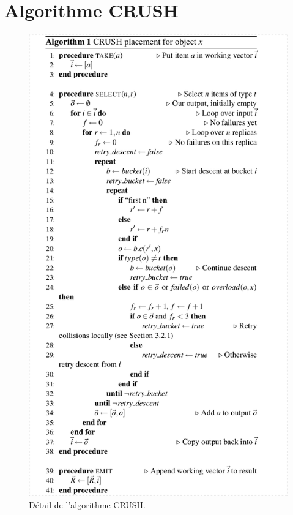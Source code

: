 \chapter{Algorithme CRUSH}
\label{crush-algo}

\begin{figure}
  \centering
  \includegraphics[scale=.5]{./images/algo_crush.png}
  \caption{Détail de l'algorithme CRUSH.}
  \label{chap3:CRUSH_algo}
\end{figure}

